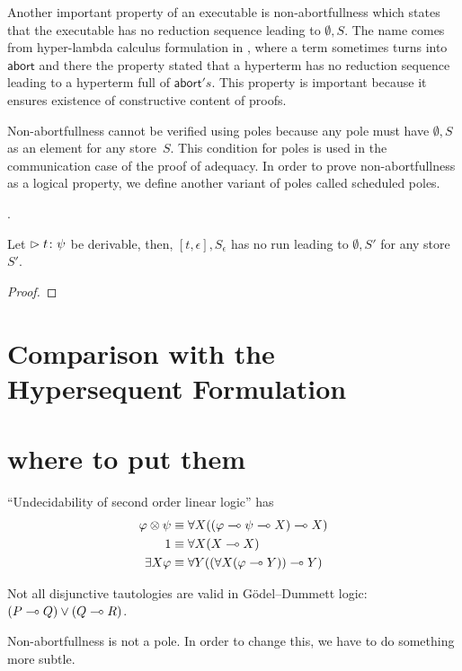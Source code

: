 Another important property of an executable is
non-abortfullness
which states that the executable has no reduction sequence leading to
$\emptyset,S$.
The name comes from hyper-lambda calculus formulation in ,
where a term sometimes turns into $\mathsf{abort}$ and there the property
stated that a hyperterm has no reduction sequence leading to a hyperterm
full of $\mathsf{abort}'s$.
This property is important because it ensures existence of
constructive content of proofs.

Non-abortfullness cannot be verified using poles
because any pole must have $\emptyset,S$ as an element for
any store~$S$.
This condition for poles is used in the
communication case of the proof of adequacy.
In order to prove non-abortfullness as a logical property,
we define another variant of poles called scheduled poles.


.


\begin{proposition}
Let $\vartriangleright{t} \colon{\psi}$ be derivable, then,
 $[t,\epsilon], S_\epsilon$ has no run leading to $\emptyset, S'$ for
 any store $S'$.
\end{proposition}
\begin{proof}
\end{proof}



\section{Comparison with the Hypersequent Formulation}


\section*{where to put them}

``Undecidability of second order linear logic'' has
\begin{align*}
 \varphi\otimes \psi&\equiv \forall X((\varphi\multimap\psi\multimap X)\multimap X) \\
 {1}      &\equiv \forall X(X\multimap X)\\
 \exists X\varphi   &\equiv \forall Y((\forall X(\varphi\multimap Y))\multimap Y)
\end{align*}

Not all disjunctive tautologies are valid in G\"odel--Dummett logic:
$(P\multimap Q)\lor(Q\multimap R)$.

Non-abortfullness is not a pole.
In order to change this, we have to do something more subtle.
